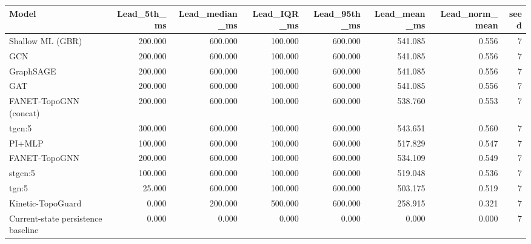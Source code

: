 \begin{tabular}{lrrrrrrr}
\toprule
Model & Lead\_5th\_ms & Lead\_median\_ms & Lead\_IQR\_ms & Lead\_95th\_ms & Lead\_mean\_ms & Lead\_norm\_mean & seed \\
\midrule
Shallow ML (GBR) & 200.000 & 600.000 & 100.000 & 600.000 & 541.085 & 0.556 & 7 \\
GCN & 200.000 & 600.000 & 100.000 & 600.000 & 541.085 & 0.556 & 7 \\
GraphSAGE & 200.000 & 600.000 & 100.000 & 600.000 & 541.085 & 0.556 & 7 \\
GAT & 200.000 & 600.000 & 100.000 & 600.000 & 541.085 & 0.556 & 7 \\
FANET-TopoGNN (concat) & 200.000 & 600.000 & 100.000 & 600.000 & 538.760 & 0.553 & 7 \\
tgcn:5 & 300.000 & 600.000 & 100.000 & 600.000 & 543.651 & 0.560 & 7 \\
PI+MLP & 100.000 & 600.000 & 100.000 & 600.000 & 517.829 & 0.547 & 7 \\
FANET-TopoGNN & 200.000 & 600.000 & 100.000 & 600.000 & 534.109 & 0.549 & 7 \\
stgcn:5 & 100.000 & 600.000 & 100.000 & 600.000 & 519.048 & 0.536 & 7 \\
tgn:5 & 25.000 & 600.000 & 100.000 & 600.000 & 503.175 & 0.519 & 7 \\
Kinetic-TopoGuard & 0.000 & 200.000 & 500.000 & 600.000 & 258.915 & 0.321 & 7 \\
Current-state persistence baseline & 0.000 & 0.000 & 0.000 & 0.000 & 0.000 & 0.000 & 7 \\
\bottomrule
\end{tabular}
